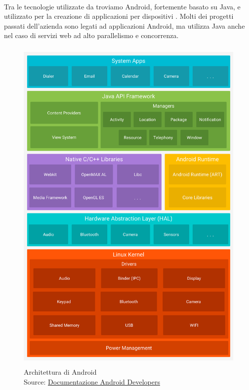    \paragraph*{} Tra le tecnologie utilizzate da \nomeAzienda{} troviamo Android, fortemente basato su Java, e utilizzato per la creazione di applicazioni per dispositivi . Molti dei progetti passati dell'azienda sono legati ad applicazioni Android, ma \nomeAzienda{} utilizza Java anche nel caso di servizi web ad alto parallelismo e concorrenza.
   \begin{figure}[H]
      \begin{center}
         \includegraphics[width=16.5cm,height=17cm,keepaspectratio]{immagini/android-stack}
      \end{center}
      \caption[Architettura di Android]{Architettura di Android
      \\
      Source: \href{https://developer.android.com/guide/platform/index.html}{Documentazione Android Developers}}
   \end{figure}

